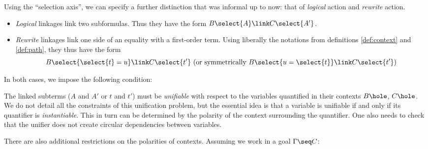Using the ``selection axis'', we can specify a further distinction that was
informal up to now: that of \emph{logical} action and \emph{rewrite} action.
\begin{itemize}
  \item \emph{Logical} linkages link two subformulas. Thus they have the form
  $B\select{A} \link C\select{A'}$.
  \item \emph{Rewrite} linkages link one side of an equality with a first-order
  term. Using liberally the notations from definitions \ref{def:context} and
  \ref{def:path}, they thus have the form
  $$B\select{\select{t} = u} \link C
  \select{t'} \text{\ (or symmetrically $B\select{u = \select{t}} \link C
  \select{t'}$)}$$
\end{itemize}
In both cases, we impose the following condition:
\begin{condition}[Unification]\label{cond:unif}
  The linked subterms ($A$ and $A'$ or $t$ and $t'$) must be \emph{unifiable}
  with respect to the variables quantified in their contexts $B\hole$, $C\hole$.
  We do not detail all the constraints of this unification problem, but the
  essential idea is that a variable is unifiable if and only if its quantifier
  is \emph{instantiable}. This in turn can be determined by the polarity of the
  context surrounding the quantifier. One also needs to check that the unifier
  does not create circular dependencies between variables.
\end{condition}


There are also additional restrictions on the polarities of contexts.
Assuming we work in a goal $\Gamma\seq C$:
  

